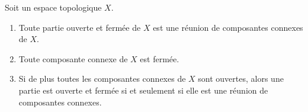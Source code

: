 \begin{proposition}	\label{PROPooWSBAooVJvDfm}
	Soit un espace topologique \( X\).
	\begin{enumerate}
		\item		\label{ITEMooAUQGooQuwBFR}
		      Toute partie ouverte et fermée de \( X\) est une réunion de composantes connexes de \( X\).
		\item		\label{ITEMooCEAIooLCmlpT}
		      Toute composante connexe de \( X\) est fermée.
		\item		\label{ITEMooKRSVooOLGqtu}
		      Si de plus toutes les composantes connexes de \( X\) sont ouvertes, alors une partie est ouverte et fermée si et seulement si elle est une réunion de composantes connexes.
	\end{enumerate}
\end{proposition}

